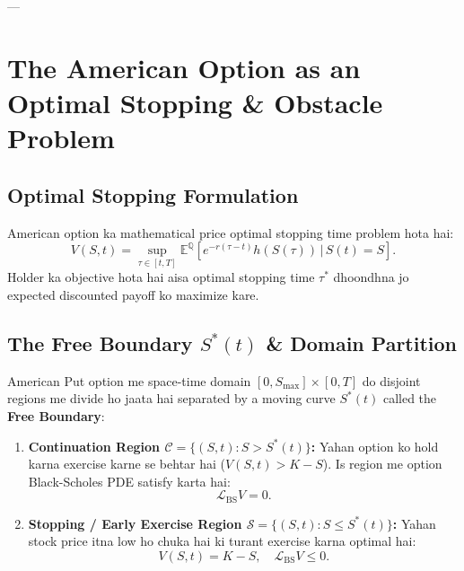 \documentclass[11pt,a4paper,oneside]{book}
\begin{document}
---

\chapter{The American Option as an Optimal Stopping \& Obstacle Problem}

\section{Optimal Stopping Formulation}
American option ka mathematical price optimal stopping time problem hota hai:
\begin{equation}
    V(S, t) = \sup_{\tau \in [t, T]} \mathbb{E}^\mathbb{Q} \left[ e^{-r(\tau - t)} h(S(\tau)) \,\Big|\, S(t) = S \right].
\end{equation}
Holder ka objective hota hai aisa optimal stopping time $\tau^*$ dhoondhna jo expected discounted payoff ko maximize kare.

\section{The Free Boundary $S^*(t)$ \& Domain Partition}
American Put option me space-time domain $[0, S_{\max}] \times [0, T]$ do disjoint regions me divide ho jaata hai separated by a moving curve $S^*(t)$ called the \textbf{Free Boundary}:

\begin{enumerate}[leftmargin=1.5em]
    \item \textbf{Continuation Region $\mathcal{C} = \{(S, t) : S > S^*(t)\}$:}
    Yahan option ko hold karna exercise karne se behtar hai ($V(S, t) > K - S$). Is region me option Black-Scholes PDE satisfy karta hai:
    \begin{equation}
        \mathcal{L}_{\text{BS}} V = 0.
    \end{equation}
    \item \textbf{Stopping / Early Exercise Region $\mathcal{S} = \{(S, t) : S \le S^*(t)\}$:}
    Yahan stock price itna low ho chuka hai ki turant exercise karna optimal hai:
    \begin{equation}
        V(S, t) = K - S, \quad \mathcal{L}_{\text{BS}} V \le 0.
    \end{equation}
\end{enumerate}
\end{document}
